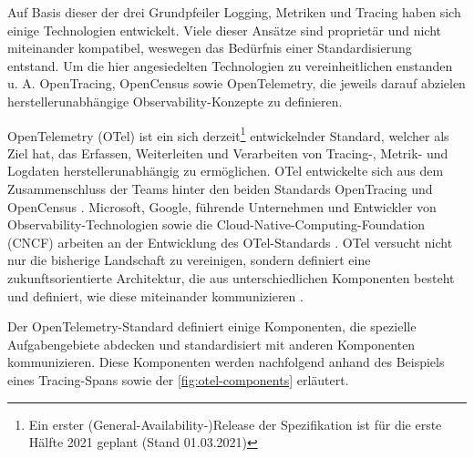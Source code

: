 
Auf Basis dieser der drei Grundpfeiler Logging, Metriken und Tracing haben sich einige Technologien entwickelt. Viele dieser Ansätze sind proprietär und nicht miteinander kompatibel, weswegen das Bedürfnis einer Standardisierung entstand. Um die hier angesiedelten Technologien zu vereinheitlichen enstanden u. A. OpenTracing, OpenCensus \cite{OpenCensus} sowie OpenTelemetry, die jeweils darauf abzielen herstellerunabhängige Observability-Konzepte zu definieren.

OpenTelemetry (OTel) ist ein sich derzeit\footnote{Ein erster (General-Availability-)Release der Spezifikation ist für die erste Hälfte 2021 geplant \cite{OpenTelemetryGARelease} (Stand 01.03.2021)} entwickelnder Standard, welcher als Ziel hat, das Erfassen, Weiterleiten und Verarbeiten von Tracing-, Metrik- und Logdaten\footnotemark{} herstellerunabhängig zu ermöglichen. OTel entwickelte sich aus dem Zusammenschluss der Teams hinter den beiden Standards OpenTracing und OpenCensus  \cite{UseNixDistributiveTracing}. Microsoft, Google, führende Unternehmen und Entwickler von Observability-Technologien sowie die Cloud-Native-Computing-Foundation (CNCF) arbeiten an der Entwicklung des OTel-Standards \cite{DistributedTracingInPractice} \cite{OpenTelemetryCommunityMembers}. OTel versucht nicht nur die bisherige Landschaft zu vereinigen, sondern definiert eine zukunftsorientierte Architektur, die aus unterschiedlichen Komponenten besteht und definiert, wie diese miteinander kommunizieren \cite{DistributedTracingInPractice}.


Der OpenTelemetry-Standard definiert einige Komponenten, die spezielle Aufgabengebiete abdecken und standardisiert mit anderen Komponenten kommunizieren. Diese Komponenten werden nachfolgend anhand des Beispiels eines Tracing-Spans sowie der \autoref{fig:otel-components} erläutert.

